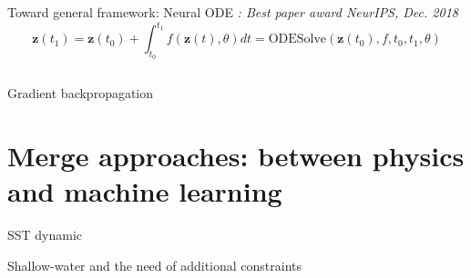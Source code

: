 \documentclass[handout]{beamer}
\newcommand{\rref}[1][]{\hfill{\scriptsize\textit{#1}}}
\begin{document}
\begin{frame}{Toward general framework: Neural ODE}
    \rref[\cite{Chen2018NeuralEquations}: Best paper award NeurIPS, Dec. 2018]
    $$
    \mathbf{z}(t_1) = \mathbf{z}(t_0)  + \int_{t_0}^{t_1} f(\mathbf{z}(t),\theta) dt = \textrm{ODESolve}(\mathbf{z}(t_0),f,t_0,t_1,\theta)
    $$
    \begin{columns}
    \end{columns}
\end{frame}

\begin{frame}{Gradient backpropagation}

\end{frame}

\section{Merge approaches: between physics and machine learning}
\begin{frame}{SST dynamic}
    
\end{frame}
\begin{frame}{Shallow-water and the need of additional constraints}
    
\end{frame}

\begin{frame}{}
   
\end{frame}
    
\end{document}
